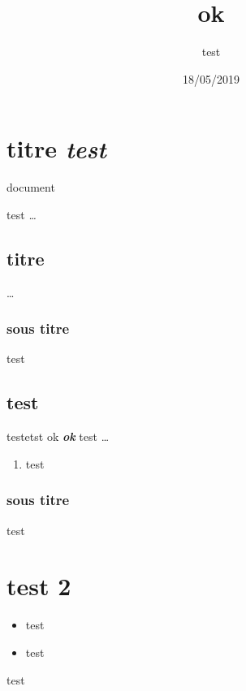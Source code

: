 \author{test}
\title{ok}
\date{18/05/2019}


\maketitle

\section{titre \textit{test}}

document

test \textit{\ldots}

\subsection{titre}

\ldots

\subsubsection{sous titre}

test

\subsection{test}

testetst 
ok
\textit{\textbf{ok}}
test
\ldots

\begin{enumerate}
\item test
\end{enumerate}

\subsubsection{sous titre}

test

        \section{test 2}

    \begin{itemize}
\item test
        \item test
\end{itemize}

test

